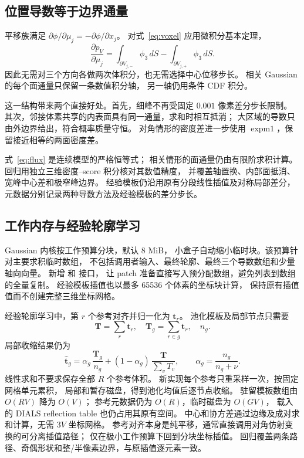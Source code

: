 \documentclass[UTF8,11pt,a4paper,fontset=fandol]{ctexart}
\begin{document}
\subsection{位置导数等于边界通量}

平移族满足
$\partial\phi/\partial\mu_j=-\partial\phi/\partial x_j$。
对式~\eqref{eq:voxel} 应用微积分基本定理，
\begin{equation}
\boxed{\quad
\frac{\partial p_V}{\partial\mu_j}
=\int_{\partial V_{j,-}}\phi_3\,dS
 -\int_{\partial V_{j,+}}\phi_3\,dS .\quad}
\label{eq:flux}
\end{equation}
因此无需对三个方向各做两次体积分，也无需选择中心位移步长。
相关 Gaussian 的每个面通量只保留一条数值积分轴，
另一轴仍用条件 CDF 积分。

这一结构带来两个直接好处。首先，细峰不再受固定 $0.001$ 像素差分步长限制。
其次，邻接体素共享的内表面具有同一通量，求和时相互抵消；
大区域的导数只由外边界给出，符合概率质量守恒。
对角情形的密度差进一步使用 $\operatorname{expm1}$，保留接近相等的两面密度差。

式~\eqref{eq:flux} 是连续模型的严格恒等式；
相关情形的面通量仍由有限阶求积计算。
回归用独立三维密度--score 积分核对其数值精度，
并覆盖轴置换、内部面抵消、宽峰中心差和极窄峰边界。
经验模板仍沿用原有分段线性插值及对称局部差分，
元数据分别记录两种导数方法及经验模板的差分步长。

\subsection{工作内存与经验轮廓学习}

Gaussian 内核按工作预算分块，默认 8 MiB，
小盒子自动缩小临时块。该预算针对主要求积临时数组，
不包括调用者输入、最终轮廓、最终三个导数数组和少量轴向向量。
新增  和  接口，
让 patch 准备直接写入预分配数组，避免列表到数组的全量复制。
经验模板插值也以最多 65536 个体素的坐标块计算，
保持原有插值值而不创建完整三维坐标网格。

经验轮廓学习中，第 $r$ 个参考对齐并归一化为 $\bm t_r$。
池化模板及局部节点只需要
\[
\bm T=\sum_r\bm t_r,\quad
\bm T_g=\sum_{r\in g}\bm t_r,\quad n_g .
\]
局部收缩结果仍为
\begin{equation}
\widehat{\bm t}_g=
\alpha_g\,\frac{\bm T_g}{n_g}+
(1-\alpha_g)\,\frac{\bm T}{\sum_v T_v},
\qquad
\alpha_g=\frac{n_g}{n_g+\nu}.
\end{equation}
线性求和不要求保存全部 $R$ 个参考体积。
新实现每个参考只重采样一次，按固定网格单元累积，
局部和暂存磁盘，得到池化均值后逐节点收缩。
驻留模板数组由 $O(RV)$ 降为 $O(V)$；
参考元数据仍为 $O(R)$，临时磁盘为 $O(GV)$，
载入的 DIALS reflection table 也仍占用其原有空间。
中心和协方差通过边缘及成对求和计算，无需 $3V$ 坐标网格。
参考对齐本身是纯平移，通常直接调用对角仿射变换的可分离插值路径\cite{scipyaffine}；
仅在极小工作预算下回到分块坐标插值。
回归覆盖两条路径、奇偶形状和整/半像素边界，与原插值逐元素一致。
\end{document}

